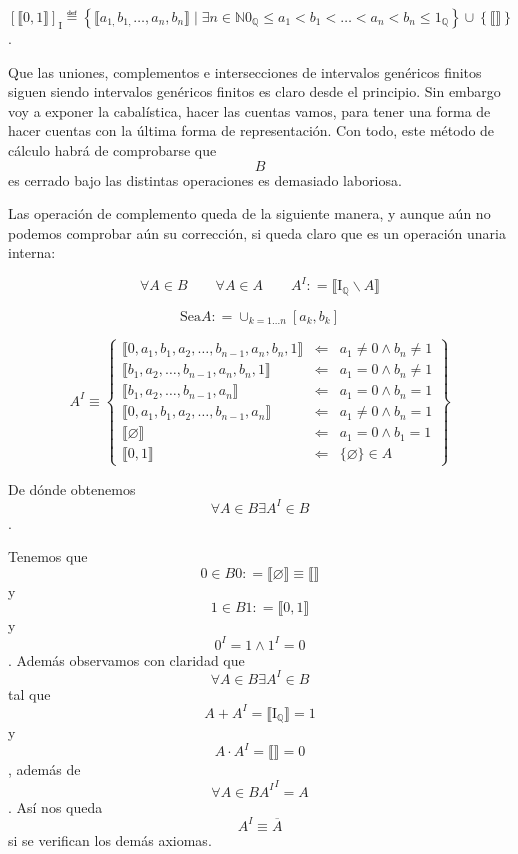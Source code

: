 \documentclass[
]{article}
\begin{document}
\begin{enumerate}
\begin{enumerate}
\begin{enumerate}
      \[\left\lbrack {⟦0,1⟧} \right\rbrack_{\mathbf{\mathrm{I}}} ≝ {\left\{ {{⟦{a_{1,}b_{1,}\ldots,a_{n},b_{n}}⟧} \mid {\exists{n \in \mathbb{N}}{{{{{{0_{\mathbb{Q}} \leq a_{1}} < b_{1}} < \ldots} < a_{n}} < b_{n}} \leq 1_{\mathbb{Q}}}}} \right\} \cup \left\{ {⟦⟧} \right\}}\].
    \end{enumerate}
  \end{enumerate}

  Que las uniones, complementos e intersecciones de intervalos genéricos
  finitos siguen siendo intervalos genéricos finitos es claro desde el
  principio. Sin embargo voy a exponer la cabalística, hacer las cuentas
  vamos, para tener una forma de hacer cuentas con la última forma de
  representación. Con todo, este método de cálculo habrá de comprobarse
  que \[B\] es cerrado bajo las distintas operaciones es demasiado
  laboriosa.

  Las operación de complemento queda de la siguiente manera, y aunque
  aún no podemos comprobar aún su corrección, si queda claro que es un
  operación unaria interna:

  \[\forall{A \in B}\qquad\forall{A \in A}\qquad A^{I}{: = {⟦{\mathbf{\mathrm{I}}_{\mathbb{Q}} \smallsetminus A}⟧}}\]

  \[\text{Sea}A{: = \cup_{{k = 1.}..n}}\left\lbrack {a_{k},b_{k}} \right\rbrack\]

  \[A^{I} \equiv \begin{Bmatrix}
  {⟦{0,a_{1},b_{1},a_{2},\ldots,b_{n - 1},a_{n},b_{n},1}⟧} & \Leftarrow & {a_{1} \neq {0 \land b_{n}} \neq 1} \\
  {⟦{b_{1},a_{2},\ldots,b_{n - 1},a_{n},b_{n},1}⟧} & \Leftarrow & {a_{1} = {0 \land b_{n}} \neq 1} \\
  {⟦{b_{1},a_{2},\ldots,b_{n - 1},a_{n}}⟧} & \Leftarrow & {a_{1} = {0 \land b_{n}} = 1} \\
  {⟦{0,a_{1},b_{1},a_{2},\ldots,b_{n - 1},a_{n}}⟧} & \Leftarrow & {a_{1} \neq {0 \land b_{n}} = 1} \\
  {⟦\varnothing ⟧} & \Leftarrow & {a_{1} = {0 \land b_{1}} = 1} \\
  {⟦0,1⟧} & \Leftarrow & {{\{\varnothing\}} \in A}
  \end{Bmatrix}\]

  De dónde obtenemos\[\forall{A \in B}\exists{A^{I} \in B}\].

  Tenemos que \[{0 \in B}0{{: = {⟦\varnothing ⟧}} \equiv {⟦⟧}}\]y
  \[{1 \in B}1{: = {⟦0,1⟧}}\]y \[{0^{I} = {1 \land 1^{I}}} = 0\]. Además
  observamos con claridad que
  \[\forall{A \in B}\exists{A^{I} \in B}\]tal
  que\[{{A + A^{I}} = {⟦\mathbf{\mathrm{I}}_{\mathbb{Q}}⟧}} = 1\]y
  \[{{A \cdot A^{I}} = {⟦⟧}} = 0\], además de
  \[\forall{A \in B}{{A^{I}}^{I} = A}\]. Así nos queda
  \[A^{I} \equiv \overline{A}\]si se verifican los demás axiomas.


\end{enumerate}
\end{document}

